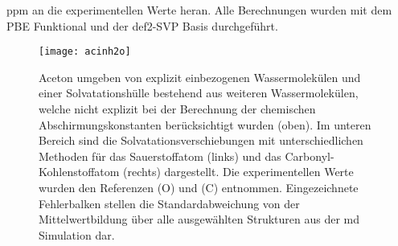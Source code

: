 \unit[3]{ppm} an die experimentellen Werte heran. Alle Berechnungen wurden mit dem PBE Funktional und der def2-SVP Basis durchgeführt.
	\begin{figure}[ht!]
	\centering
	\texttt{[image: acinh2o]}
	\captionsetup{figurewithin = chapter}
	\captionsetup{font=small, labelfont=bf}\caption[Solvatationseffekt für Aceton in Wasser]{Aceton umgeben von explizit einbezogenen Wassermolekülen und einer Solvatationshülle bestehend aus weiteren Wassermolekülen, welche nicht explizit bei der Berechnung der chemischen Abschirmungskonstanten berücksichtigt wurden (oben). Im unteren Bereich sind die Solvatationsverschiebungen mit unterschiedlichen Methoden für das Sauerstoffatom (links) und das Carbonyl-Kohlenstoffatom (rechts) dargestellt. Die experimentellen Werte wurden den Referenzen \cite{cossi2003different} (O) und \cite{tiffon1978effet} (C) entnommen. Eingezeichnete Fehlerbalken stellen die Standardabweichung von der Mittelwertbildung über alle ausgewählten Strukturen aus der \ac{md} Simulation dar.}
\label{abb:acinh2o}
\end{figure}
\FloatBarrier
